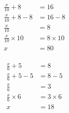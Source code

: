 \documentclass[12pt]{article}
\newcounter{minipagecount}
\begin{document}
\begin{multicols}{2}
\noindent{(\theminipagecount)}\hspace{0.1mm} %
\begin{minipage}[t]{0.45\textwidth} %
    \vspace{-26pt}  %
    \raggedright %
    \begin{align*} %
        \frac{x}{10} + 8 &= 16\\
        \frac{x}{10} + 8 - 8 &= 16 - 8\\
        \frac{x}{10} &= 8\\
        \frac{x}{10} \times10 &= 8 \times10\\
        x &= 80\\
    \end{align*}
\end{minipage} %
\noindent{(\theminipagecount)}\hspace{0.1mm} %
\begin{minipage}[t]{0.45\textwidth} %
    \vspace{-26pt}  %
    \raggedright %
    \begin{align*} %
        \frac{x}{6} + 5 &= 8\\
        \frac{x}{6} + 5 - 5 &= 8 - 5\\
        \frac{x}{6} &= 3\\
        \frac{x}{6} \times6 &= 3 \times6\\
        x &= 18\\

\end{align*}
\end{minipage}
\end{multicols}
\end{document}

